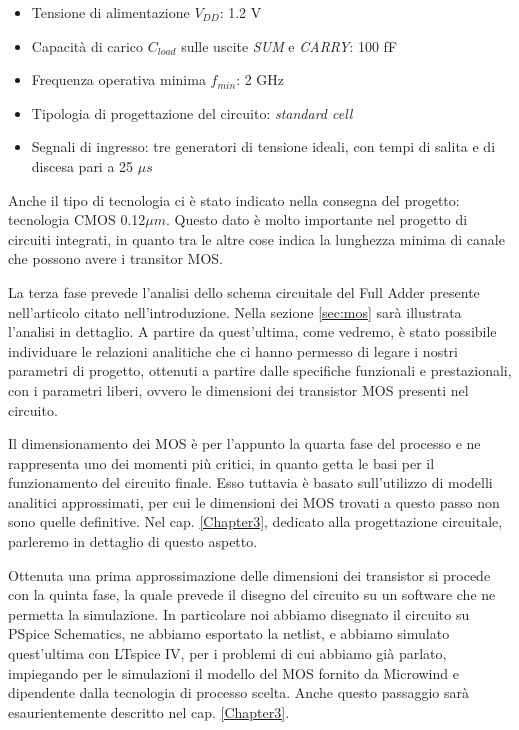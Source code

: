 \begin{itemize}
	\item Tensione di alimentazione $V _{DD}$: 1.2 V
	\item Capacità di carico $C _{load}$ sulle uscite \textit{SUM} e \textit{CARRY}: 100 fF
	\item Frequenza operativa minima $f _{min}$: 2 GHz
	\item Tipologia di progettazione del circuito: \textit{standard cell}
	\item Segnali di ingresso: tre generatori di tensione ideali, con tempi di salita e di discesa pari a 25 $\mu s$
\end{itemize}

Anche il tipo di tecnologia ci è stato indicato nella consegna del progetto: tecnologia CMOS 0.12$\mu m$. Questo dato è molto importante nel progetto di circuiti integrati, in quanto tra le altre cose indica la lunghezza minima di canale che possono avere i transitor MOS.

La terza fase prevede l'analisi dello schema circuitale del Full Adder presente nell'articolo citato nell'introduzione. Nella sezione \ref{sec:mos} sarà illustrata l'analisi in dettaglio. A partire da quest'ultima, come vedremo, è stato possibile individuare le relazioni analitiche che ci hanno permesso di legare i nostri parametri di progetto, ottenuti a partire dalle specifiche funzionali e prestazionali, con i parametri liberi, ovvero le dimensioni dei transistor MOS presenti nel circuito. 

Il dimensionamento dei MOS è per l'appunto la quarta fase del processo e ne rappresenta uno dei momenti più critici, in quanto getta le basi per il funzionamento del circuito finale. Esso tuttavia è basato sull'utilizzo di modelli analitici approssimati, per cui le dimensioni dei MOS trovati a questo passo non sono quelle definitive. Nel cap. \ref{Chapter3}, dedicato alla progettazione circuitale, parleremo in dettaglio di questo aspetto.

Ottenuta una prima approssimazione delle dimensioni dei transistor si procede con la quinta fase, la quale prevede il disegno del circuito su un software che ne permetta la simulazione. In particolare noi abbiamo disegnato il circuito su PSpice Schematics, ne abbiamo esportato la netlist, e abbiamo simulato quest'ultima con LTspice IV, per i problemi di cui abbiamo già parlato, impiegando per le simulazioni il modello del MOS fornito da Microwind e dipendente dalla tecnologia di processo scelta. Anche questo passaggio sarà esaurientemente descritto nel cap. \ref{Chapter3}.

